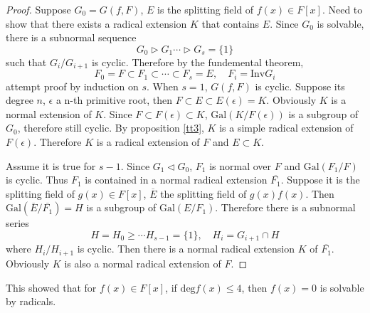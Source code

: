 \begin{proof}
    Suppose $G_0=G(f,F)$, $E$ is the splitting field of $f(x)\in F[x]$. Need to show that there exists a radical extension $K$ that contains $E$. Since $G_0$ is solvable, there is a subnormal sequence 
    $$G_0\triangleright G_1\cdots\triangleright G_s=\{1\}$$
    such that $G_i/G_{i+1}$ is cyclic. Therefore by the fundemental theorem,
    $$
    F_0=F\subset F_1\subset\cdots\subset F_s=E,\quad F_i=\mathrm{Inv}G_i
    $$
    attempt proof by induction on $s$. When $s=1$, $G(f,F)$ is cyclic. Suppose its degree $n$, $\epsilon$ a n-th primitive root, then $F\subset E\subset E(\epsilon)=K$. Obviously $K$ is a normal extension of $K$. Since $F\subset F(\epsilon)\subset K$, $\mathrm{Gal}(K/F(\epsilon))$ is a subgroup of $G_0$, therefore still cyclic. By proposition \ref{tt3}, $K$ is a simple radical extension of $F(\epsilon)$. Therefore $K$ is a radical extension of $F$ and $E\subset K$.
    \par Assume it is true for $s-1$. Since $G_1\triangleleft G_0$, $F_1$ is normal over $F$ and $\mathrm{Gal}(F_1/F)$ is cyclic. Thus $F_1$ is contained in a normal radical extension $\overline{F_1}$. Suppose it is the splitting field of $g(x)\in F[x]$, $\overline{E}$ the splitting field of $g(x)f(x)$. Then $\mathrm{Gal}(\overline{E}/\overline{F_1})=H$ is a subgroup of $\mathrm{Gal}(E/F_1)$. Therefore there is a subnormal series
    $$
    H=H_0\ge\cdots H_{s-1}=\{1\},\quad H_i=G_{i+1}\cap H
    $$
    where $H_i/H_{i+1}$ is cyclic. Then there is a normal radical extension $K$ of $\overline{F_1}$. Obviously $K$ is also a normal radical extension of $F$.
\end{proof}
\begin{remark}
    This showed that for $f(x)\in F[x]$, if $\mathrm{deg}f(x)\le 4$, then $f(x)=0$ is solvable by radicals.
\end{remark}